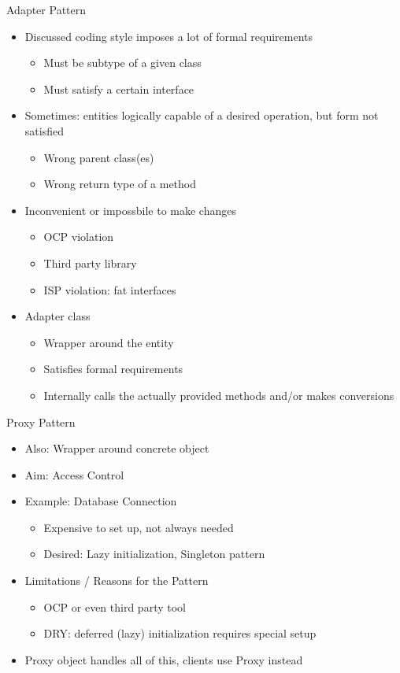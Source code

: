 \begin{frame}{Adapter Pattern}
%
\begin{itemize}
\item Discussed coding style imposes a lot of formal requirements
	\begin{itemize}
	\item Must be subtype of a given class
	\item Must satisfy a certain interface
	\end{itemize}
\pause
\item Sometimes: entities logically capable of a desired operation, but form not satisfied
	\begin{itemize}
	\item Wrong parent class(es)
	\item Wrong return type of a method
	\end{itemize}
\item Inconvenient or impossbile to make changes
	\begin{itemize}
	\item OCP violation
	\item Third party library
	\item ISP violation: fat interfaces
	\end{itemize}
\pause
\item Adapter class
	\begin{itemize}
	\item Wrapper around the entity
	\item Satisfies formal requirements
	\item Internally calls the actually provided methods and/or makes conversions
	\end{itemize}
\end{itemize}
%
\end{frame}


\begin{frame}{Proxy Pattern}
%
\begin{itemize}
\item Also: Wrapper around concrete object
\item Aim: Access Control
\item Example: Database Connection
	\begin{itemize}
	\item Expensive to set up, not always needed
	\item Desired: Lazy initialization, Singleton pattern
	\end{itemize}
\item Limitations / Reasons for the Pattern
	\begin{itemize}
	\item OCP or even third party tool
	\item DRY: deferred (lazy) initialization requires special setup
	\end{itemize}
\item[\Thus] Proxy object handles all of this, clients use Proxy instead
\end{itemize}
%
\end{frame}

